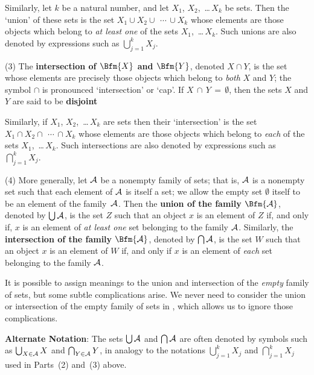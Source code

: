         Similarly, let $k$ be a natural number, and let $X_{1}$, $X_{2}$, \,{\ldots}\,$X_{k}$ be sets.
    Then the  `union' of these sets is the set $X_{1}{\cup}X_{2}{\cup}\ \,{\cdots}\, {\cup} X_{k}$ whose elements are those objects which belong to {\em at least one} of the sets $X_{1}$, \,{\ldots}\,$X_{k}$.
    Such unions are also denoted by expressions such as ${\displaystyle {\bigcup}_{j=1}^{k} X_{j}}$.


\V

        (3) The {\bf intersection of $\Bfm{X}$ and $\Bfm{Y}$}, denoted $X{\cap}Y$, is the set whose elements are precisely those objects which belong to {\em both} $X$ and $Y$;
    the symbol ${\cap}$ is pronounced `intersection' or `cap'.
    If $X\,{\cap}\,Y \,=\, {\emptyset}$, then the sets $X$ and $Y$ are said to be {\bf disjoint}

        Similarly, if $X_{1}$, $X_{2}$, \,{\ldots}\,$X_{k}$ are sets then their  `intersection' is the set $X_{1}{\cap}X_{2}{\cap}\ \,{\cdots}\, {\cap} X_{k}$ whose elements are those objects which belong to {\em each} of the sets $X_{1}$, \,{\ldots}\,$X_{k}$.
    Such intersections are also denoted by expressions such as ${\displaystyle {\bigcap}_{j=1}^{k} X_{j}}$.

\V

        (4) More generally, let ${\cal A}$ be a nonempty family of sets;
	that is, ${\cal A}$ is a nonempty set such that each element of ${\cal A}$ is itself a set;
    we allow the empty set ${\emptyset}$ itself to be an element of the family~${\cal A}$.
    Then the {\bf union of the family $\Bfm{{\cal A}}$}, denoted by ${\bigcup}\,{\cal A}$,
    is the set $Z$ such that an object $x$ is an element of $Z$ if, and only if, $x$ is an element of {\em at least one} set belonging to the family ${\cal A}$.
    Similarly, the {\bf intersection of the family $\Bfm{{\cal A}}$}, denoted by ${\bigcap}\,{\cal A}$,
    is the set $W$ such that an object $x$ is an element of $W$ if, and only if  $x$ is an element of {\em each} set belonging to the family ${\cal A}$.

        It is possible to assign meanings to the union and intersection of the {\em empty} family of sets, but some subtle complications arise.
    We never need to consider the union or intersection of the empty family of sets in {\TheseNotes}, which allows us to ignore those complications.

        {\bf Alternate Notation}: The sets ${\bigcup}\, {\cal A}$ and ${\bigcap}\, {\cal A}$ are often denoted by symbols such as
    ${\bigcup}_{X{\in}{\cal A}}\,X$ and ${\bigcap}_{Y{\in}{\cal A}}\,Y$, in analogy to the notations ${\displaystyle {\bigcup}_{j=1}^{k} X_{j}}$ and ${\displaystyle {\bigcap}_{j=1}^{k} X_{j}}$ used in Parts~(2) and~(3) above.

